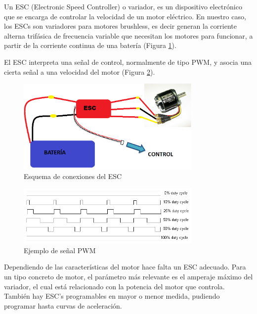 \documentclass[12pt,twoside]{article}
\begin{document}
			Un ESC (Electronic Speed Controller) o variador, es un dispositivo electrónico que se encarga de controlar la velocidad de un motor eléctrico. En nuestro caso, los ESCs son variadores para motores brushless, es decir generan la corriente alterna trifásica de frecuencia variable que necesitan los motores para funcionar, a partir de la corriente continua de una batería (Figura \ref{fig:esc_conexiones}).
			
El ESC interpreta una señal de control, normalmente de tipo PWM, y asocia una cierta señal a una velocidad del motor (Figura \ref{fig:esc_pwm}). 
		\begin{figure}
			\centering
			\includegraphics[width=0.8\textwidth]{Imatges/Funcionament/esc_conexiones.png}
			\caption{Esquema de conexiones del ESC}
			\label{fig:esc_conexiones}
		\end{figure}
		
		\begin{figure}
			\centering
			\includegraphics[width=0.8\textwidth]{Imatges/Funcionament/esc_pwm.png}
			\caption{Ejemplo de señal PWM}
			\label{fig:esc_pwm}
		\end{figure}

			

		Dependiendo de las características del motor hace falta un ESC adecuado. Para un tipo concreto de motor, el parámetro más relevante es el amperaje máximo del variador, el cual está relacionado con la potencia del motor que controla. También hay ESC’s programables en mayor o menor medida, pudiendo programar hasta curvas de aceleración.
\end{document}
